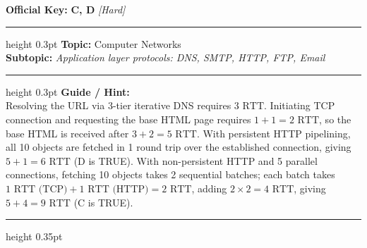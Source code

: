 \documentclass[a4paper,10pt]{article}
\begin{document}
\begin{tcolorbox}
\tcblower

\textbf{Official Key:} \textbf{\large C, D} \hfill \textit{\small [Hard]}
\vspace{2pt}\hrule height 0.3pt\vspace{3pt}
\textbf{Topic:} Computer Networks \\
\textbf{Subtopic:} \textit{Application layer protocols: DNS, SMTP, HTTP, FTP, Email}
\vspace{2pt}\hrule height 0.3pt\vspace{3pt}
\textbf{Guide / Hint:} \\
{\small Resolving the URL via 3-tier iterative DNS requires $3\text{ RTT}$. Initiating TCP connection and requesting the base HTML page requires $1 + 1 = 2\text{ RTT}$, so the base HTML is received after $3 + 2 = 5\text{ RTT}$. With persistent HTTP pipelining, all 10 objects are fetched in 1 round trip over the established connection, giving $5 + 1 = 6\text{ RTT}$ (D is TRUE). With non-persistent HTTP and 5 parallel connections, fetching 10 objects takes 2 sequential batches; each batch takes $1\text{ RTT (TCP)} + 1\text{ RTT (HTTP)} = 2\text{ RTT}$, adding $2 \times 2 = 4\text{ RTT}$, giving $5 + 4 = 9\text{ RTT}$ (C is TRUE).}

\end{tcolorbox}
\vspace{6pt}\hrule height 0.35pt\vspace{6pt}
\noindent
\end{document}
